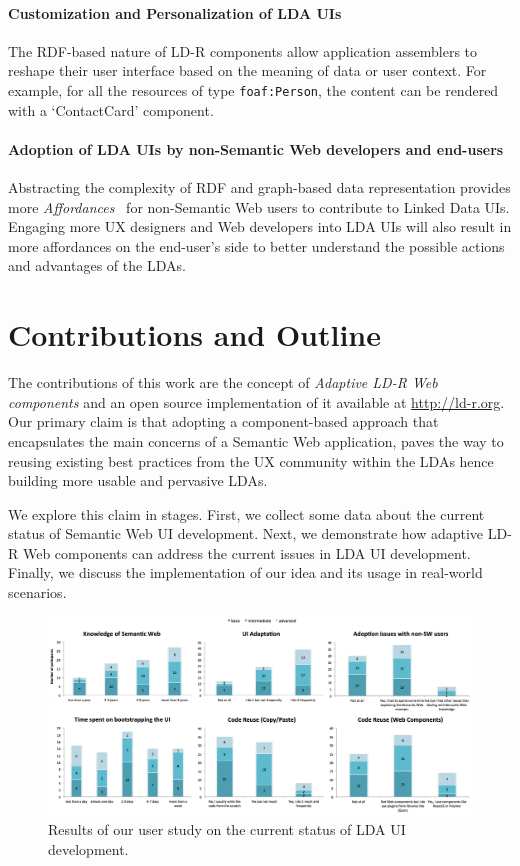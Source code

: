 \documentclass{acm_proc_article-sp}
\begin{document}
\paragraph{Customization and Personalization of LDA UIs} 
The RDF-based nature of LD-R components allow application assemblers to reshape their user interface based on the meaning of data or user context.
For example, for all the resources of type \texttt{foaf:Person}, the content can be rendered with a `ContactCard' component.

\paragraph{Adoption of LDA UIs by non-Semantic Web developers and end-users} 
Abstracting the complexity of RDF and graph-based data representation provides more \emph{Affordances}~\cite{Norman2013} for non-Semantic Web users to contribute to Linked Data UIs.
Engaging more UX designers and Web developers into LDA UIs will also result in more affordances on the end-user's side to better understand the possible actions and advantages of the LDAs.

\section{Contributions and Outline}
The contributions of this work are the concept of \emph{Adaptive LD-R Web components} and an open source implementation of it available at \url{http://ld-r.org}.
Our primary claim is that adopting a component-based approach that encapsulates the main concerns of a Semantic Web application, paves the way to reusing existing best practices from the UX community within the LDAs hence building more usable and pervasive LDAs.

We explore this claim in stages.
First, we collect some data about the current status of Semantic Web UI development.
Next, we demonstrate how adaptive LD-R Web components can address the current issues in LDA UI development.
Finally, we discuss the implementation of our idea and its usage in real-world scenarios.

\begin{figure}[tb]
  \includegraphics[width=1\linewidth]{images/userstudy.png}
  \caption{Results of our user study on the current status of LDA UI development.}
  \label{fig:userstudy}
\end{figure}
\end{document}
